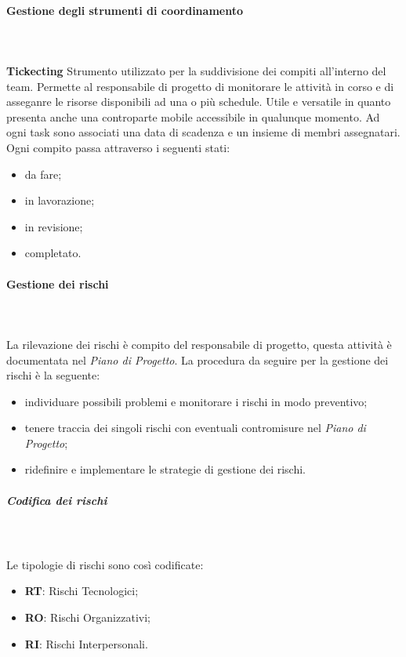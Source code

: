 			\paragraph{Gestione degli strumenti di coordinamento} \mbox{}\\ \mbox{}\\
			\textbf{Tickecting} \newline \newline
			Strumento utilizzato per la suddivisione dei compiti all'interno del team. Permette al responsabile di progetto di monitorare le attività in corso e di asseganre le risorse disponibili ad una o più schedule\glo.\newline
			Utile e versatile in quanto presenta anche una controparte mobile accessibile in qualunque momento. Ad ogni task sono associati una data di scadenza e un insieme di membri assegnatari. Ogni compito passa attraverso i seguenti stati:
			\begin{itemize}
				\item da fare;
				\item in lavorazione;
				\item in revisione;
				\item completato.
			\end{itemize}


			\paragraph{Gestione dei rischi} \mbox{}\\ \mbox{}\\
			La rilevazione dei rischi è compito del responsabile di progetto, questa attività è documentata nel \textit{Piano di Progetto}.
	        La procedura da seguire per la gestione dei rischi è la seguente:
			\begin{itemize}
				\item individuare possibili problemi e monitorare i rischi in modo preventivo;
				\item tenere traccia dei singoli rischi con eventuali contromisure nel \textit{Piano di Progetto};
				\item ridefinire e implementare le strategie di gestione dei rischi.
			\end{itemize}
			
			\noindent
			\subparagraph{Codifica dei rischi} \mbox{}\\ \mbox{}\\
				Le tipologie di rischi sono così codificate:
				\begin{itemize}
					\item \textbf{RT}: Rischi Tecnologici;
					\item \textbf{RO}: Rischi Organizzativi;
					\item \textbf{RI}: Rischi Interpersonali.
				\end{itemize}

